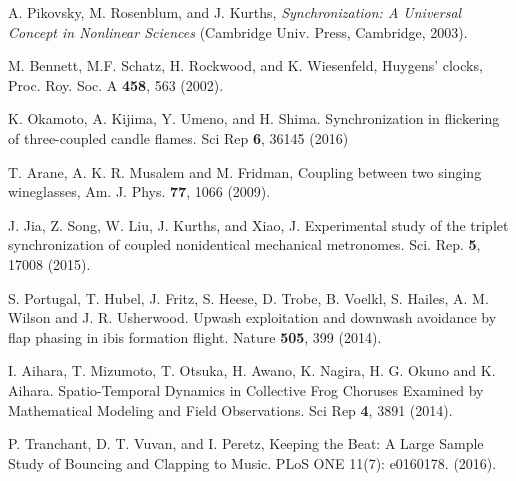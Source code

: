 \documentclass[twocolumn,preprintnumbers,amsmath,amssymb,aps,prx]{revtex4}
\begin{document}
\begin{thebibliography}{99}

  
 A. Pikovsky, M. Rosenblum, and J. Kurths, {\it Synchronization: A Universal Concept in Nonlinear Sciences} (Cambridge Univ. Press, Cambridge, 2003).
  
 M. Bennett, M.F. Schatz, H. Rockwood, and K. Wiesenfeld, Huygens' clocks, Proc. Roy. Soc. A {\bf 458}, 563 (2002).
  
 K. Okamoto, A. Kijima, Y. Umeno, and H. Shima. Synchronization in flickering of three-coupled candle flames. Sci Rep {\bf 6}, 36145 (2016)

 T. Arane, A. K. R. Musalem and M. Fridman, Coupling between two singing wineglasses, Am. J. Phys. {\bf 77}, 1066 (2009). %
  
  J. Jia, Z. Song, W. Liu, J. Kurths, and Xiao, J. Experimental study of the triplet synchronization of coupled nonidentical mechanical metronomes. Sci. Rep. {\bf 5}, 17008 (2015).

  
  
 S. Portugal, T. Hubel, J. Fritz, S. Heese, D. Trobe, B. Voelkl, S. Hailes, A. M. Wilson and J. R. Usherwood.  Upwash exploitation and downwash avoidance by flap phasing in ibis formation flight. Nature {\bf 505}, 399 (2014).

   I. Aihara, T. Mizumoto, T. Otsuka, H. Awano, K. Nagira, H. G. Okuno and K. Aihara. Spatio-Temporal Dynamics in Collective Frog Choruses Examined by Mathematical Modeling and Field Observations. Sci Rep {\bf 4}, 3891 (2014). 

   P. Tranchant, D. T. Vuvan, and I. Peretz, Keeping the Beat: A Large Sample Study of Bouncing and Clapping to Music. PLoS ONE 11(7): e0160178. (2016).


\end{thebibliography}
\end{document}
